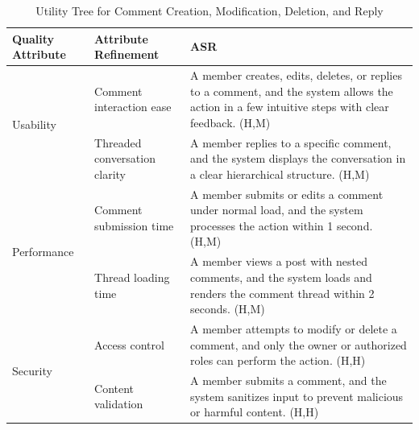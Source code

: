 \documentclass{article}
\begin{document}
\begin{table}[H]
    \centering
    \caption{Utility Tree for Comment Creation, Modification, Deletion, and Reply}
    \begin{tabular}{|p{3cm}|p{4cm}|p{7cm}|}
        \hline
        \textbf{Quality Attribute} & \textbf{Attribute Refinement}                                                                                                                   & \textbf{ASR} \\
        \hline

        \multirow{2}{*}{Usability}
                                   & Comment interaction ease
                                   & A member creates, edits, deletes, or replies to a comment, and the system allows the action in a few intuitive steps with clear feedback. (H,M)                \\
        \cline{2-3}
                                   & Threaded conversation clarity
                                   & A member replies to a specific comment, and the system displays the conversation in a clear hierarchical structure. (H,M)                                      \\
        \hline

        \multirow{2}{*}{Performance}
                                   & Comment submission time
                                   & A member submits or edits a comment under normal load, and the system processes the action within 1 second. (H,M)                                              \\
        \cline{2-3}
                                   & Thread loading time
                                   & A member views a post with nested comments, and the system loads and renders the comment thread within 2 seconds. (H,M)                                        \\
        \hline

        \multirow{2}{*}{Security}
                                   & Access control
                                   & A member attempts to modify or delete a comment, and only the owner or authorized roles can perform the action. (H,H)                                          \\
        \cline{2-3}
                                   & Content validation
                                   & A member submits a comment, and the system sanitizes input to prevent malicious or harmful content. (H,H)                                                      \\
        \hline


\end{tabular}
\end{table}
\end{document}
